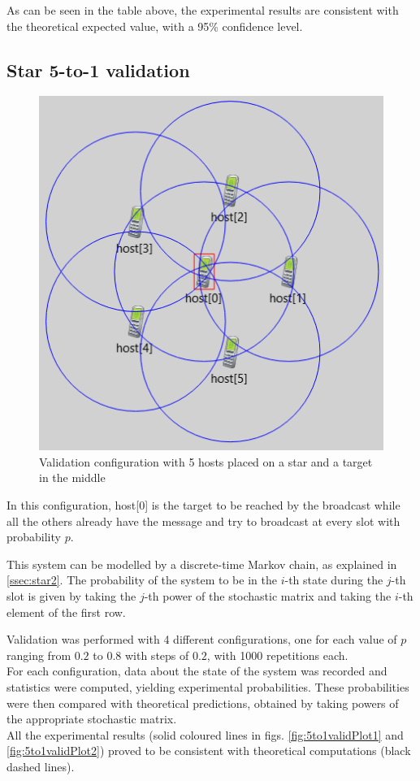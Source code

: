 As can be seen in the table above, %
the experimental results are consistent with the theoretical expected value, with a 95\% confidence level. %
\subsection{Star 5-to-1 validation}


\begin{figure}
\includegraphics[width=1\linewidth]{img/omnetStar5to1.png} 
\caption{Validation configuration with 5 hosts placed on a star and a target in the middle}
\label{fig:star5to1GUI}
\end{figure}

In this configuration, host[0] is the target to be reached by the broadcast while all the others already have the message and try to broadcast at every slot with probability $p$.

This system can be modelled by a discrete-time Markov chain, as explained in \ref{ssec:star2}.
The probability of the system to be in the $i$-th state during the $j$-th slot is given by taking the $j$-th power of the stochastic matrix and taking the $i$-th element of the first row.

Validation was performed with 4 different configurations, one for each value of $p$ ranging from $0.2$ to $0.8$ with steps of $0.2$, with 1000 repetitions each.\\
For each configuration, data about the state of the system was recorded and statistics were computed, yielding experimental probabilities. These probabilities were then compared with theoretical predictions, obtained by taking powers of the appropriate stochastic matrix.\\
All the experimental results (solid coloured lines in figs. \ref{fig:5to1validPlot1} and \ref{fig:5to1validPlot2}) proved to be consistent with theoretical computations (black dashed lines).

